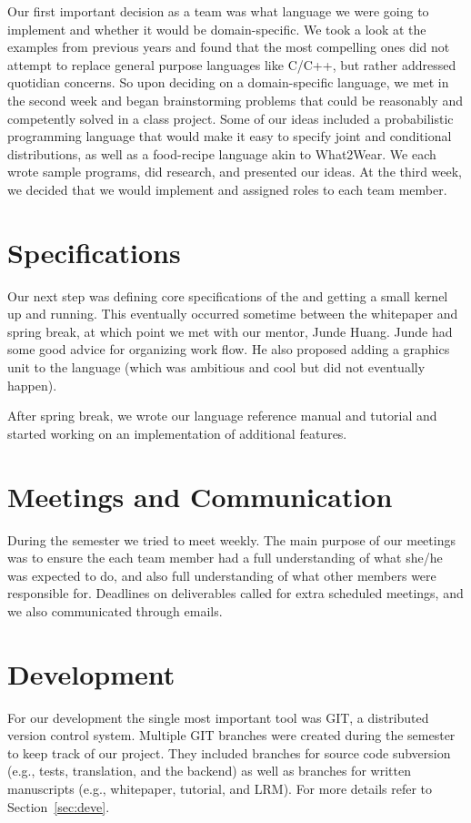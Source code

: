 Our first important decision as a team was what language we were going to implement and whether it would be domain-specific. We took a look at the examples from previous years and found that the most compelling ones did not attempt to replace general purpose languages like C/C++, but rather addressed quotidian concerns. So upon deciding on a domain-specific language, we met in the second week and began brainstorming problems that could be reasonably and competently solved in a class project. Some of our ideas included a probabilistic programming language that would make it easy to specify joint and conditional distributions, as well as a food-recipe language akin to What2Wear. We each wrote sample programs, did research, and presented our ideas. At the third week, we decided that we would implement \lang{} and assigned roles to each team member. 

\section{Specifications}
Our next step was defining core specifications of the \lang{} and getting a small kernel up and running. This eventually occurred sometime between the whitepaper and spring break, at which point we met with our mentor, Junde Huang. Junde had some good advice for organizing work flow. He also proposed adding a graphics unit to the language (which was ambitious and cool but did not eventually happen).

After spring break, we wrote our language reference manual and tutorial and started working on an implementation of additional features.

\section{Meetings and Communication}
During the semester we tried to meet weekly. The main purpose of our meetings was to ensure the each team member had a full understanding of what she/he was expected to do, and also full understanding of what other members were responsible for. Deadlines on deliverables called for extra scheduled meetings, and we also communicated through emails.

\section{Development}
For our development the single most important tool was GIT, a distributed
version control system. Multiple GIT branches were created during the semester
to keep track of our project. They included branches for source code
subversion (e.g., tests, translation, and the \lang{} backend) as well as
branches for written manuscripts (e.g., whitepaper, tutorial,  and LRM).
For more details refer to Section~\ref{sec:deve}.

